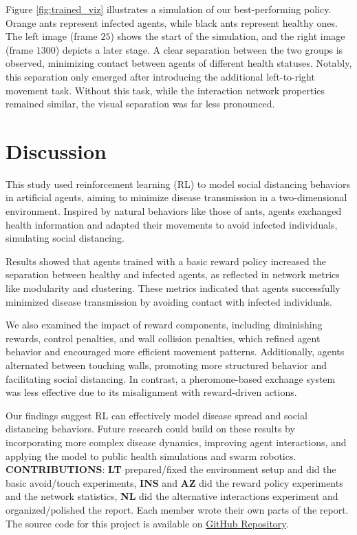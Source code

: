 \documentclass[9pt]{IEEEtran}
\begin{document}
Figure \ref{fig:trained_viz} illustrates a simulation of our best-performing policy. Orange ants represent infected agents, while black ants represent healthy ones. The left image (frame $25$) shows the start of the simulation, and the right image (frame $1300$) depicts a later stage. A clear separation between the two groups is observed, minimizing contact between agents of different health statuses. Notably, this separation only emerged after introducing the additional left-to-right movement task. Without this task, while the interaction network properties remained similar, the visual separation was far less pronounced.

\section{Discussion}

This study used reinforcement learning (RL) to model social distancing behaviors in artificial agents, aiming to minimize disease transmission in a two-dimensional environment. Inspired by natural behaviors like those of ants, agents exchanged health information and adapted their movements to avoid infected individuals, simulating social distancing.

Results showed that agents trained with a basic reward policy increased the separation between healthy and infected agents, as reflected in network metrics like modularity and clustering. These metrics indicated that agents successfully minimized disease transmission by avoiding contact with infected individuals.

We also examined the impact of reward components, including diminishing rewards, control penalties, and wall collision penalties, which refined agent behavior and encouraged more efficient movement patterns. Additionally, agents alternated between touching walls, promoting more structured behavior and facilitating social distancing. In contrast, a pheromone-based exchange system was less effective due to its misalignment with reward-driven actions.

Our findings suggest RL can effectively model disease spread and social distancing behaviors. Future research could build on these results by incorporating more complex disease dynamics, improving agent interactions, and applying the model to public health simulations and swarm robotics.
\\

\noindent\textbf{CONTRIBUTIONS}: \textbf{LT} prepared/fixed the environment setup and did the basic avoid/touch experiments, \textbf{INS} and \textbf{AZ} did the reward policy experiments and the network statistics, \textbf{NL} did the alternative interactions experiment and organized/polished the report. Each member wrote their own parts of the report.\\

The source code for this project is available on \href{https://github.com/JuiceVodka/SV_2024-25_groupF}{GitHub Repository}.

\printbibliography
\end{document}
